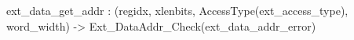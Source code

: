 ext_data_get_addr : (regidx, xlenbits, AccessType(ext_access_type), word_width) -> Ext_DataAddr_Check(ext_data_addr_error)